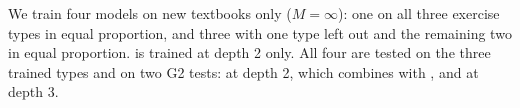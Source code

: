 We train four models on new textbooks only ($M=\infty$): one on all three exercise types in equal proportion, and three with one type left out and the remaining two in equal proportion.
 is trained at depth 2 only.
All four are tested on the three trained types and on two G2 tests:  at depth 2, which combines  with , and  at depth 3.

\begin{table}[t]
\centering\small

\caption{E2: accuracy (\%) on new textbooks after training with one exercise type left out. Each cell gives the mean over seeds, followed by the number of seeds that ended at 95\% or above out of the number run. Guessing levels: 20\% for , 25\% for , \GuessTwo\% for -2, \GuessThree\% for -3, and 26.7\% on -2 for a model that has induced $g$ but cannot combine it with a table look-up (see text).}
\label{tab:e2}
\end{table}


